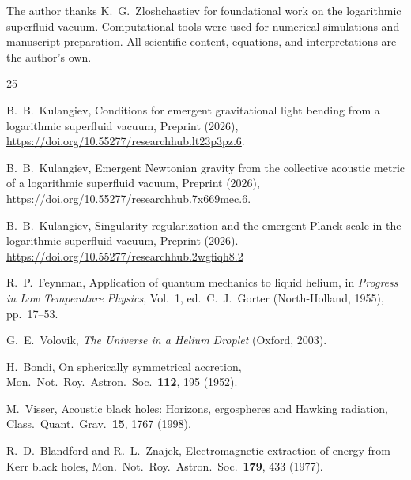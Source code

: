 \documentclass[12pt, a4paper]{article}
\begin{document}
The author thanks K.~G.~Zloshchastiev for
foundational work on the logarithmic superfluid
vacuum. Computational tools were used for numerical
simulations and manuscript preparation. All
scientific content, equations, and interpretations
are the author's own.


\begin{thebibliography}{25}

B.~B.~Kulangiev,
Conditions for emergent gravitational light bending
from a logarithmic superfluid vacuum,
Preprint (2026),
\url{https://doi.org/10.55277/researchhub.lt23p3pz.6}.

B.~B.~Kulangiev,
Emergent Newtonian gravity from the collective acoustic
metric of a logarithmic superfluid vacuum,
Preprint (2026),
\url{https://doi.org/10.55277/researchhub.7x669mec.6}.

B.~B.~Kulangiev,
Singularity regularization and the emergent Planck scale in the logarithmic superfluid vacuum,
Preprint (2026).
\url{https://doi.org/10.55277/researchhub.2wgfiqh8.2}

R.~P.~Feynman,
Application of quantum mechanics to liquid helium,
in \emph{Progress in Low Temperature Physics}, Vol.~1,
ed.\ C.~J.~Gorter (North-Holland, 1955), pp.~17--53.

G.~E.~Volovik,
\emph{The Universe in a Helium Droplet} (Oxford, 2003).

H.~Bondi,
On spherically symmetrical accretion,
Mon.\ Not.\ Roy.\ Astron.\ Soc.\ \textbf{112}, 195
(1952).

M.~Visser,
Acoustic black holes: Horizons, ergospheres and Hawking
radiation,
Class.\ Quant.\ Grav.\ \textbf{15}, 1767 (1998).

R.~D.~Blandford and R.~L.~Znajek,
Electromagnetic extraction of energy from Kerr black
holes,
Mon.\ Not.\ Roy.\ Astron.\ Soc.\ \textbf{179}, 433
(1977).

\end{thebibliography}
\end{document}
